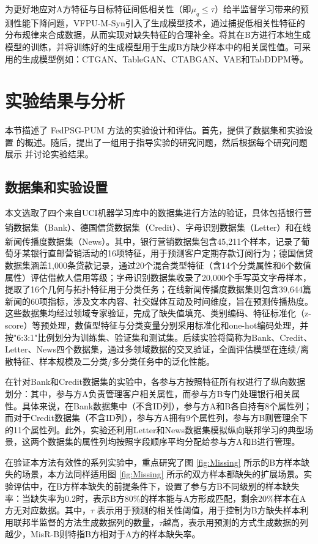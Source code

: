 为更好地应对A方特征与目标特征间低相关性（即$\mu_q \leq \tau$）给半监督学习带来的预测性能下降问题，VFPU-M-Syn引入了生成模型技术，通过捕捉低相关性特征的分布规律来合成数据，从而实现对缺失特征的合理补全。将其在B方进行本地生成模型的训练，并将训练好的生成模型用于生成B方缺少样本中的相关属性值。可采用的生成模型例如：CTGAN、TableGAN、CTABGAN、VAE和TabDDPM等。
\section{实验结果与分析}
本节描述了 FedPSG-PUM 方法的实验设计和评估。首先，提供了数据集和实验设置 的概述。随后，提出了一组用于指导实验的研究问题，然后根据每个研究问题展示 并讨论实验结果。
\subsection{数据集和实验设置} \label{subsec:data_experiment}
本文选取了四个来自UCI机器学习库中的数据集进行方法的验证，具体包括银行营销数据集（Bank）、德国信贷数据集（Credit）、字母识别数据集（Letter）\textsuperscript{\cite{serbian}}和在线新闻传播度数据集（News）\textsuperscript{\cite{news}}。其中，银行营销数据集包含45,211个样本，记录了葡萄牙某银行直邮营销活动的16项特征，用于预测客户定期存款订阅行为；德国信贷数据集涵盖1,000条贷款记录，通过20个混合类型特征（含14个分类属性和6个数值属性）评估借款人信用等级；字母识别数据集收录了20,000个手写英文字母样本，提取了16个几何与拓扑特征用于分类任务；在线新闻传播度数据集则包含39,644篇新闻的60项指标，涉及文本内容、社交媒体互动及时间维度，旨在预测传播热度。这些数据集均经过领域专家验证，完成了缺失值填充、类别编码、特征标准化（z-score）等预处理，数值型特征与分类变量分别采用标准化和one-hot编码处理，并按"6:3:1"比例划分为训练集、验证集和测试集。后续实验将简称为Bank、Credit、Letter、News四个数据集，通过多领域数据的交叉验证，全面评估模型在连续/离散特征、样本规模及二分类/多分类任务中的泛化性能。

在针对Bank和Credit数据集的实验中，各参与方按照特征所有权进行了纵向数据划分：其中，参与方A负责管理客户相关属性，而参与方B专门处理银行相关属性。具体来说，在Bank数据集中（不含ID列），参与方A和B各自持有8个属性列；而对于Credit数据集（不含ID列），参与方A拥有9个属性列，参与方B则管理余下的11个属性列。此外，实验还利用Letter和News数据集模拟纵向联邦学习的典型场景，这两个数据集的属性列均按照字段顺序平均分配给参与方A和B进行管理。

在验证本方法有效性的系列实验中，重点研究了图 \ref{fig:Missing} 所示的B方样本缺失的场景，本方法同样适用图 \ref{fig:Missing} 所示的双方样本都缺失的扩展场景。实验评估中，在B方样本缺失的前提条件下，设置了参与方B不同级别的样本缺失率：当缺失率为0.2时，表示B方80\%的样本能与A方形成匹配，剩余20\%样本在A方无对应数据。其中，$\tau$ 表示用于预测的相关性阈值，用于控制为B方缺失样本利用联邦半监督的方法生成数据列的数量，$\tau$越高，表示用预测的方式生成数据的列越少，MisR-B则特指B方相对于A方的样本缺失率。
